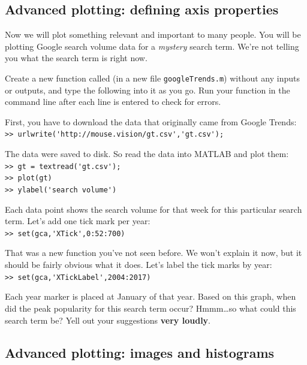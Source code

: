 \documentclass{article}
\begin{document}
\pagebreak
\subsection{Advanced plotting: defining axis properties}

Now we will plot something relevant and important to many people.
You will be plotting Google search volume data for a \emph{mystery} search term.
We're not telling you what the search term is right now.

Create a new function called  (in a new file \texttt{googleTrends.m}) without any inputs or outputs, and type the following into it as you go.
Run your function in the command line after each line is entered to check for errors.

First, you have to download the data that originally came from Google Trends:\\
\verb|>> urlwrite('http://mouse.vision/gt.csv','gt.csv');|

The data were saved to disk. So read the data into MATLAB and plot them:\\
\verb|>> gt = textread('gt.csv');|\\
\verb|>> plot(gt)|\\
\verb|>> ylabel('search volume')|

Each data point shows the search volume for that week for this particular search term.
Let's add one tick mark per year:\\
\verb|>> set(gca,'XTick',0:52:700)|

That was a new function you've not seen before.
We won't explain it now, but it should be fairly obvious what it does.
Let's label the tick marks by year:\\
\verb|>> set(gca,'XTickLabel',2004:2017)|

Each year marker is placed at January of that year.
Based on this graph, when did the peak popularity for this search term occur?
Hmmm\ldots so what could this search term be?
Yell out your suggestions \textbf{very loudly}.


\pagebreak
\subsection{Advanced plotting: images and histograms}
\end{document}
